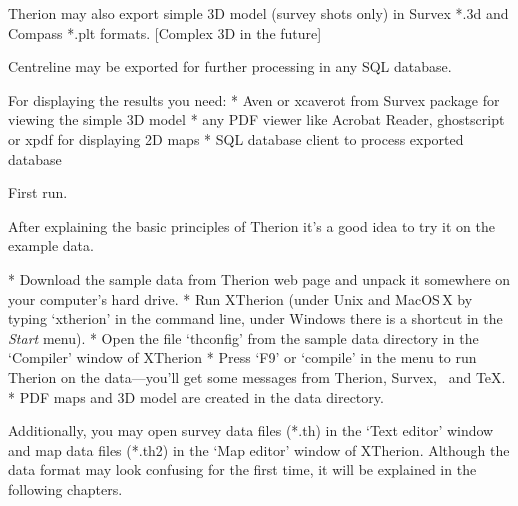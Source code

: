 Therion may also export simple 3D model (survey shots only) in Survex *.3d 
and Compass *.plt formats. [Complex 3D in the future]

Centreline may be exported for further processing in any SQL 
database.

For displaying the results you need:
\list
* Aven or xcaverot from Survex package for viewing the simple 3D model
* any PDF viewer like Acrobat Reader, ghostscript or xpdf for displaying  
  2D maps
* SQL database client to process exported database
\endlist



\subchapter First run.

After explaining the basic principles of Therion it's a good idea to try it
on the example data.

\list
* Download the sample data from Therion web page and unpack it somewhere on
  your computer's hard drive.
* Run XTherion (under Unix and MacOS\,X by typing `xtherion' in the command 
  line, under Windows there is a shortcut in the {\it Start} menu).
* Open the file `thconfig' from the sample data directory in the `Compiler'
  window of XTherion
* Press `F9' or `compile' in the menu to run Therion on the data---you'll get
  some messages from Therion, Survex, \MP\ and \TeX.  
* PDF maps and 3D model are created in the data directory.  
\endlist

Additionally, you may open survey data files (*.th) in the `Text editor' window 
and map data files (*.th2) in the `Map editor' window of XTherion. Although the 
data format may look confusing for the first time, it will be explained in the 
following chapters.

\endinput
